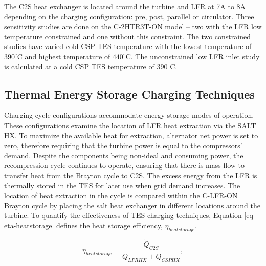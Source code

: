 \begin{paracol}{2}
\linenumbers
\switchcolumn

The C2S heat exchanger is located around the turbine and LFR at 7A to 8A depending on the charging configuration: pre, post, parallel or circulator. Three sensitivity studies are done on the C-2HTR3T-ON model -- two with the LFR low temperature constrained and one without this constraint. The two constrained studies have varied cold CSP TES temperature with the lowest temperature of $390^{\circ}$C and highest temperature of $440^{\circ}$C. The unconstrained low LFR inlet study is calculated at a cold CSP TES temperature of $390^{\circ}$C.  



\subsection{Thermal Energy Storage Charging Techniques} 

Charging cycle configurations accommodate energy storage modes of operation. These configurations examine the location of LFR heat extraction via the SALT HX. To maximize the available heat for extraction, alternator net power is set to zero, therefore requiring that the turbine power is equal to the compressors' demand. Despite the components being non-ideal and consuming power, the recompression cycle continues to operate, ensuring that there is mass flow to transfer heat from the Brayton cycle to C2S. The excess energy from the LFR is thermally stored in the TES for later use when grid demand increases. The location of heat extraction in the cycle is compared within the C-LFR-ON Brayton cycle by placing the salt heat exchanger in different locations around the turbine. To quantify the effectiveness of TES charging techniques, Equation \ref{eq-eta-heatstorage} defines the heat storage efficiency, $\eta_{heatstorage}$.  

\begin{equation}
    \label{eq-eta-heatstorage}
    \eta_{heatstorage} = \frac{\dot{Q}_{C2S}}{\dot{Q}_{LFRHX}+\dot{Q}_{CSPHX}},
\end{equation}


\end{paracol}
